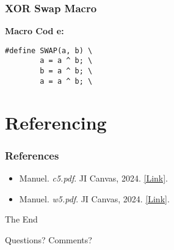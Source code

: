 \documentclass[
	11pt, %
]{beamer}
\begin{document}
\begin{frame}
    \frametitle{XOR Swap Macro}
    \textbf{Macro Cod e:}
    
    \texttt{\#define SWAP(a, b) \textbackslash} \\
    \texttt{\ \ \ \ \ \ \ \ a = a \^{} b; \textbackslash} \\
    \texttt{\ \ \ \ \ \ \ \ b = a \^{} b; \textbackslash} \\
    \texttt{\ \ \ \ \ \ \ \ a = a \^{} b; \textbackslash} \\
\end{frame}









\section{Referencing}

\begin{frame} %
	\frametitle{References}
	
	\begin{itemize}
    \item Manuel. \textit{c5.pdf}. JI Canvas, 2024. \href{https://jicanvas.com/courses/917/files/folder/lectures?preview=333615}{[Link]}.

    \item Manuel. \textit{w5.pdf}. JI Canvas, 2024. \href{https://jicanvas.com/courses/917/files/folder/worksheets?preview=333633}{[Link]}.
\end{itemize}
\end{frame}


\begin{frame}[plain] %
	\begin{center}
		{\Huge The End}
		
		\bigskip\bigskip %
		
		{\LARGE Questions? Comments?}
	\end{center}
\end{frame}

\end{document}
